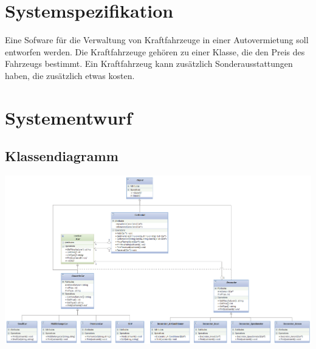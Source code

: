 \documentclass[12pt,a4paper]{article}
\begin{document}
\section{Systemspezifikation}
Eine Sofware für die Verwaltung von Kraftfahrzeuge in einer Autovermietung soll entworfen werden. Die Kraftfahrzeuge gehören zu einer Klasse, die den Preis des Fahrzeugs bestimmt. Ein Kraftfahrzeug kann zusätzlich Sonderausstattungen haben, die zusätzlich etwas kosten.
\\


\newpage
\section {Systementwurf}

\subsection {Klassendiagramm}

\includegraphics[angle=90,scale=0.55] {../Klassendiagramm.png}

\newpage
\end{document}
